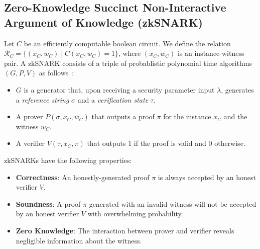 \subsection{Zero-Knowledge Succinct Non-Interactive Argument of Knowledge (zkSNARK)}
Let $C$ be an efficiently computable boolean circuit.
We define the relation $\mathcal{R}_C = \{(x_C, w_C) \mid C(x_C, w_C) = 1 \}$, where $(x_C, w_C)$ is an instance-witness pair.
A zkSNARK consists of a triple of probablistic polynomial time algorithms $(G, P, V)$ as follows~\cite{snark_defn,groth_snark}:
\begin{itemize}
    \item $G$ is a generator that, upon receiving a security parameter input $\lambda$, generates a \emph{reference string} $\sigma$ and a \emph{verification state} $\tau$.
    \item A prover $P(\sigma, x_C, w_C)$ that outputs a proof $\pi$ for the instance $x_C$ and the witness $w_C$.
    \item A verifier $V(\tau, x_C, \pi)$ that outputs 1 if the proof is valid and 0 otherwise.
\end{itemize}

zkSNARKs have the following properties:
\begin{itemize}
    \item \textbf{Correctness}: An honestly-generated proof $\pi$ is always accepted by an honest verifier $V$.
    \item \textbf{Soundness}: A proof $\pi$ generated with an invalid witness will not be accepted by an honest verifier $V$ with overwhelming probability.
    \item \textbf{Zero Knowledge}: The interaction between prover and verifier reveals negligible information about the witness.
\end{itemize}
